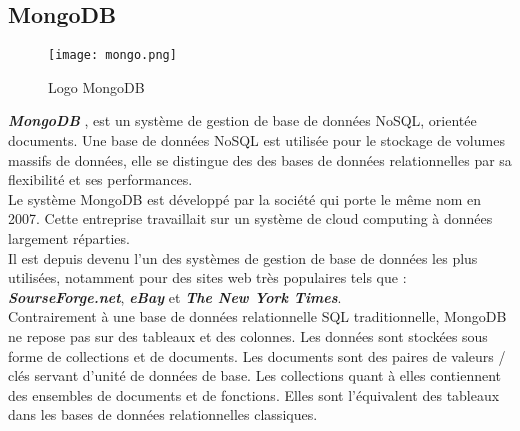 \subsection{MongoDB}
\vspace{1cm}
\begin{figure}[H]
    \centering
    \texttt{[image: mongo.png]}
    \vspace{1cm}
    \captionsetup{justification=centering}

    \caption{Logo MongoDB}
    \label{fig:mongo_logo}
\end{figure}
\textit{\textbf{MongoDB}} \cite{mongodb} , est un système de gestion de base de données NoSQL, orientée documents. Une base de données NoSQL est utilisée pour le stockage de volumes massifs de données, elle se distingue des des bases de données relationnelles par sa flexibilité et ses performances.\\
\noindent Le système MongoDB est développé par la société qui porte le même nom en 2007. Cette entreprise travaillait sur un système de cloud computing à données largement réparties.\\
\noindent Il est depuis devenu l'un des systèmes de gestion de base de données les plus utilisées, notamment pour des sites web très populaires tels que : \textit{\textbf{SourseForge.net}}, \textit{\textbf{eBay}} et \textit{\textbf{The New York Times}}.\\
\noindent Contrairement à une base de données relationnelle SQL traditionnelle, MongoDB ne repose pas sur des tableaux et des colonnes. Les données sont stockées sous forme de collections et de documents.
Les documents sont des paires de valeurs / clés servant d'unité de données de base. Les collections quant à elles contiennent des ensembles de documents et de fonctions. Elles sont l'équivalent des tableaux dans les bases de données relationnelles classiques.
